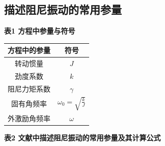 \documentclass[12pt,a4paper]{amsart}
\begin{document}
\subsection{描述阻尼振动的常用参量}

\textbf{表1 方程中参量与符号}

\begin{center}
    \begin{tabular}{|c|c|}
        \hline
        方程中的参量 & 符号                            \\
        \hline
        转动惯量     & $J$                             \\
        劲度系数     & $k$                             \\
        阻尼力矩系数 & $\gamma$                        \\
        固有角频率   & $\omega_0 = \sqrt{\frac{k}{J}}$ \\
        外激励角频率 & $\omega$                        \\
        \hline
    \end{tabular}
\end{center}

\textbf{表2 文献中描述阻尼振动的常用参量及其计算公式}
\end{document}
